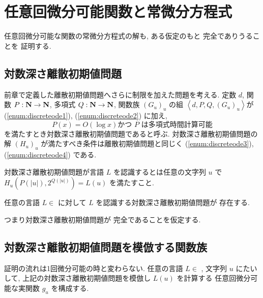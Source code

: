 \section{任意回微分可能関数と常微分方程式}

 任意回微分可能な関数の常微分方程式の解も, ある仮定のもと \PSPACE 完全でありうることを
 証明する.

  \subsection{対数深さ離散初期値問題}
  前章で定義した離散初期値問題へさらに制限を加えた問題を考える.
  定数 $d$, 関数 $P : \mathbf N \to \mathbf N$, 多項式 $Q : \mathbf N \to \mathbf N$, 
  関数族 $(G_u)_u$ の組 $\left< d, P, Q, (G_u)_u \right>$が
  (\ref{enum:discreteode1}), (\ref{enum:discreteode2}) に加え,
  \begin{equation}
   P(x) = O(\log x) \text{かつ $P$ は多項式時間計算可能}
  \end{equation}
  を満たすとき対数深さ離散初期値問題であると呼ぶ.
  対数深さ離散初期値問題の解 $(H_u)_u$ が満たすべき条件は離散初期値問題と同じく
  (\ref{enum:discreteode3}), (\ref{enum:discreteode4}) である.

  対数深さ離散初期値問題が言語 $L$ を認識するとは任意の文字列 $u$ で
  $H_u(P(|u|), 2^{Q(|u|)}) = L(u)$ を満たすこと.

 \begin{hypothesis}
  \label{Hypothesis}
  任意の言語 $L \in$ \PSPACE に対して $L$ を認識する対数深さ離散初期値問題が
  存在する.
 \end{hypothesis}

 つまり対数深さ離散初期値問題が \PSPACE 完全であることを仮定する. 

 \subsection{対数深さ離散初期値問題を模倣する関数族}

 証明の流れは1回微分可能の時と変わらない.
 任意の言語 $L \in $ \PSPACE, 文字列 $u$ にたいして,
 上記の対数深さ離散初期値問題を模倣し $L(u)$ を計算する
 任意回微分可能な実関数 $g_u$ を構成する.

